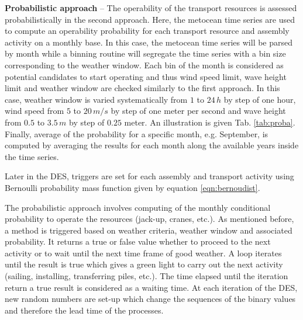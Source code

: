\textbf{Probabilistic approach} -- The operability of the transport resources is assessed probabilistically in the second approach. Here, the metocean time series are used to compute an operability probability for each transport resource and assembly activity on a monthly base. In this case, the metocean time series will be parsed by month while a binning routine will segregate the time series with a bin size corresponding to the weather window. Each bin of the month is considered as potential candidates to start operating and thus wind speed limit, wave height limit and weather window are checked similarly to the first approach. In this case, weather window is varied systematically from $1$ to $24\, h$ by step of one hour, wind speed from $5$ to $20\, m/s$ by step of one meter per second and wave height from $0.5$ to $3.5\, m$ by step of $0.25$ meter.
An illustration is given Tab. \ref{tab:proba}.
Finally, average of the probability for a specific month, e.g. September, is computed by averaging the results for each month along the available years inside the time series.


Later in the DES, triggers are set for each assembly and transport activity using Bernoulli probability mass function given by equation \ref{eqn:bernoudist}. %

The probabilistic approach involves computing of the monthly conditional probability to operate the resources (jack-up, cranes, etc.). As mentioned before, a method is triggered based on weather criteria, weather window and associated probability. It returns a true or false value whether to proceed to the next activity or to wait until the next time frame of good weather. A loop iterates until the result is true which gives a green light to carry out the next activity (sailing, installing, transferring piles, etc.). The time elapsed until the iteration return a true result is considered as a waiting time. At each iteration of the DES, new random numbers are set-up which change the sequences of the binary values and therefore the lead time of the processes.

